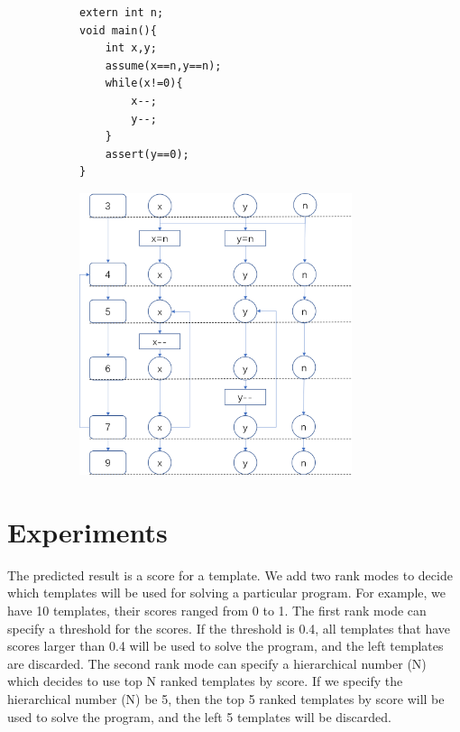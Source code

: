 \documentclass{article}
\begin{document}
\begin{figure}[h]
\begin{subfigure}[b]{0.4\textwidth}
\begin{lstlisting}
extern int n;
void main(){
    int x,y;
    assume(x==n,y==n);
    while(x!=0){
        x--;
        y--;
    }
    assert(y==0);
}
\end{lstlisting}\label{horn_graph_while-C}
\end{subfigure}
\begin{subfigure}[b]{0.4\textwidth}
  \includegraphics[width=8cm]{graph/horn_graph_while}\\
  \label{horn_graph_while}
  \end{subfigure}
  \caption{}
\end{figure}


\section{Experiments}
The predicted result is a score for a template. We add two rank modes to decide which templates will be used for solving a particular program. For example, we have 10 templates, their scores ranged from 0 to 1. The first rank mode can specify a threshold for the scores. If the threshold is 0.4, all templates that have scores larger than 0.4 will be used to solve the program, and the left templates are discarded. The second rank mode can specify a hierarchical number (N) which decides to use top N ranked templates by score. If we specify the hierarchical number (N) be 5, then the top 5 ranked templates by score will be used to solve the program, and the left 5 templates will be discarded.
\end{document}
